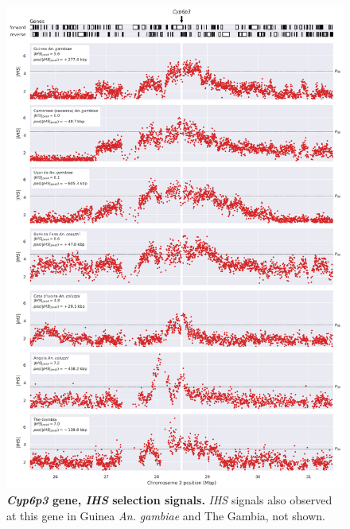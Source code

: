 \documentclass[a4paper,11pt,abstracton,hidelinks]{scrartcl}
\begin{document}
\begin{figure}[t!]
	\begin{center}
		\includegraphics*[width=1\linewidth,center]{artwork/locus_cyp6p3_ihs_pdist.png}
	\end{center}
	\caption[\textit{Cyp6p3} gene, \textit{IHS} selection signals]{
	\textbf{\textit{Cyp6p3} gene, \textit{IHS} selection signals.}
	\textit{IHS} signals also observed at this gene in Guinea \textit{An. gambiae} and The Gambia, not shown. 
	} 
	\label{fig:locus_cyp6p3_ihs}
\end{figure}
\end{document}
